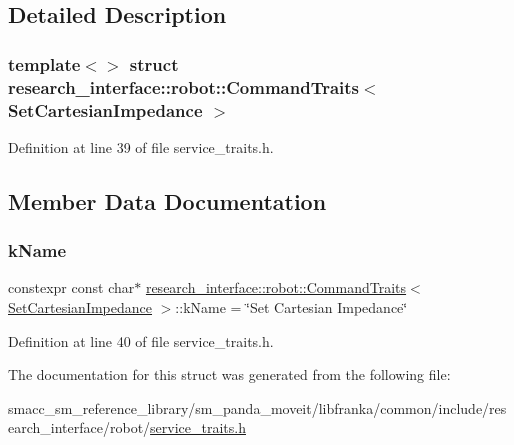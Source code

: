 \subsection{Detailed Description}
\subsubsection*{template$<$$>$\newline
struct research\+\_\+interface\+::robot\+::\+Command\+Traits$<$ Set\+Cartesian\+Impedance $>$}



Definition at line 39 of file service\+\_\+traits.\+h.



\subsection{Member Data Documentation}
\mbox{\label{structresearch__interface_1_1robot_1_1CommandTraits_3_01SetCartesianImpedance_01_4_a678aef176940e23abe6b5cb5f756e314}} 
\subsubsection{\texorpdfstring{k\+Name}{kName}}
{\footnotesize\ttfamily constexpr const char$\ast$ \hyperlink{structresearch__interface_1_1robot_1_1CommandTraits}{research\+\_\+interface\+::robot\+::\+Command\+Traits}$<$ \hyperlink{structresearch__interface_1_1robot_1_1SetCartesianImpedance}{Set\+Cartesian\+Impedance} $>$\+::k\+Name = \char`\"{}Set Cartesian Impedance\char`\"{}\hspace{0.3cm}{\ttfamily [static]}}



Definition at line 40 of file service\+\_\+traits.\+h.



The documentation for this struct was generated from the following file\+:\begin{DoxyCompactItemize}
\item 
smacc\+\_\+sm\+\_\+reference\+\_\+library/sm\+\_\+panda\+\_\+moveit/libfranka/common/include/research\+\_\+interface/robot/\hyperlink{service__traits_8h}{service\+\_\+traits.\+h}\end{DoxyCompactItemize}
